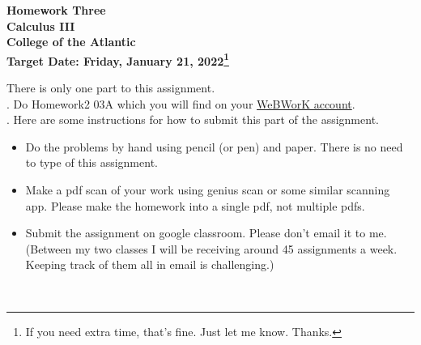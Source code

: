 \documentclass[12pt]{article}
\begin{document}
\pagestyle{empty}
 
\begin{center}
{\LARGE {\bf Homework Three}}\\
\bigskip
{\Large {\bf Calculus III}}\\
\bigskip
{\Large {\bf College of the Atlantic}}\\
\bigskip
{ {\bf Target Date: Friday, January 21, 2022\footnote{If you need extra time,
      that's fine. Just let me know. Thanks.}}}\\  
\end{center}
\medskip


\noindent There is only one part to this assignment.\\

.  Do Homework2 03A  which you will find 
on your \href{https://webwork.runestone.academy/webwork2/coa-feldman-es3028m-winter-2022/}{WeBWorK account}.\\


.  Here are some
instructions for how to submit this part of the assignment.
\begin{itemize}
\item Do the problems by hand using pencil (or pen) and paper.
  There is no need to type of this assignment.
\item Make a pdf scan of your work using genius scan or some
  similar scanning app.  Please make the homework into a single
  pdf, not multiple pdfs.
\item Submit the assignment on google classroom.  Please don't
  email it to me.  (Between my two classes I will be receiving
  around 45 assignments a week.  Keeping track of them all in email 
  is challenging.)
\end{itemize}


\\

%

%
\end{document}
